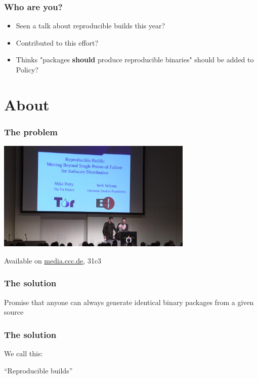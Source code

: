 \documentclass[14pt]{beamer}
\begin{document}
\begin{frame}
 \frametitle{Who are you?}
 \begin{itemize}
  \item Seen a talk about reproducible builds this year?
  \item<2-3> Contributed to this effort?
  \item<3> Thinks "packages \textbf{should} produce reproducible binaries"
    should be added to Policy?
 \end{itemize}
\end{frame}

\section{About}

\begin{frame}
 \frametitle{The problem}

 \begin{center}
  \includegraphics[width=0.7\textwidth]{images/31c3.png}

  Available on \url{media.ccc.de}, 31c3
 \end{center}
\end{frame}

\begin{frame}
 \frametitle{The solution}

 \begin{center}
 \Large{
 Promise that anyone can always generate
 identical binary packages
 from a given source}
\end{center}
\end{frame}


\begin{frame}
 \frametitle{The solution}

 \begin{center}
 We call this:

 \Huge{ “Reproducible builds” }
 \end{center}
\end{frame}
\end{document}
